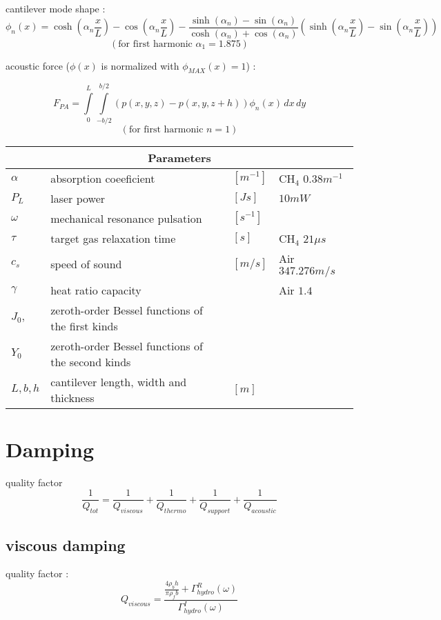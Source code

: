 \documentclass[12pt]{article}
\begin{document}
cantilever mode shape :
$$\phi_n(x) =  \cosh \left({\alpha_n\frac{x}{L}}\right) - \cos \left({\alpha_n\frac{x}{L}}\right) - \frac{\sinh{(\alpha_n)} - \sin{(\alpha_n)}}{\cosh{(\alpha_n)} + \cos{(\alpha_n)} }  \left(  \sinh \left({\alpha_n\frac{x}{L}}\right) - \sin \left({\alpha_n\frac{x}{L}}\right)  \right)$$
$$( \textrm{for first harmonic } \alpha_1 = 1.875) $$

acoustic force ($\phi(x)$ is normalized with $\phi_{MAX}(x)=1$) : 

$$F_{PA} = \int \limits_0^L \int \limits_{-b/2}^{b/2} \left(  p(x,y,z)-p(x,y,z+h) \right) \phi_n(x) \,dx \,dy $$
$$(\textrm{for first harmonic }  n=1)$$ 


\begin{tabular}{|p{2cm}||p{6cm}|p{1cm}|p{3cm}| }
  \hline
  \multicolumn{4}{|c|}{Parameters} \\
  \hline
  $\alpha$ & absorption coeeficient & $[m^{-1}]$& CH$_4$ $0.38 m^{-1}$\\
  $P_L$ & laser power & $[Js]$& $10mW$\\
  $\omega$ & mechanical resonance pulsation & $[s^{-1}]$&\\
  $\tau$ & target gas relaxation time & $[s]$& CH$_4$ $21\mu s$\\
  $c_s$ & speed of sound & $[m/s]$& Air $347.276 m/s$\\
  $\gamma$ & heat ratio capacity & & Air $1.4$\\  
  $J_0,$ & zeroth-order Bessel functions of the first kinds & & \\  
  $Y_0$ & zeroth-order Bessel functions of the second kinds & & \\ 
  $L,b,h$ & cantilever length, width and thickness & $[m]$ &\\  
  \hline
\end{tabular}

\newpage

\section{Damping}
quality factor
$$\frac {1}{Q_{tot}} =  \frac {1}{Q_{viscous}} + \frac {1}{Q_{thermo}}  + \frac {1}{Q_{support}} +  \frac {1}{Q_{acoustic}}$$
\subsection{viscous damping}

quality factor :
$$ Q_{viscous}=\frac{\frac{4\rho_bh}{\pi \rho_fb}+\Gamma_{hydro}^R(\omega)}{\Gamma_{hydro}^I(\omega)}$$
\end{document}
